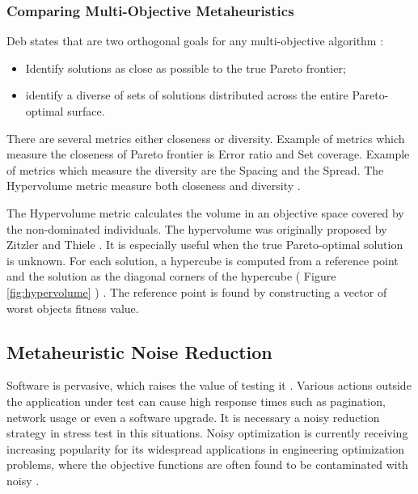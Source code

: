\documentclass[espaco=umemeio,chapter=TITLE,twoside,openright]{abnt}
\begin{document}
\subsubsection{Comparing Multi-Objective Metaheuristics}

Deb states that are two orthogonal goals for any multi-objective algorithm \cite{deb2001multi}:

\begin{itemize}
\item Identify solutions as close as possible  to the true Pareto frontier;
\item identify a diverse of sets of solutions distributed across the entire Pareto-optimal surface.
\end{itemize}

There are several metrics either closeness or diversity. Example of metrics which measure the closeness of Pareto frontier is Error ratio and Set coverage. Example of metrics which measure the diversity are the Spacing and the Spread. The Hypervolume metric measure both closeness and diversity \cite{janssens2010multiple}.

The Hypervolume metric calculates the volume in an objective space covered by the non-dominated individuals. The hypervolume was originally proposed by Zitzler and Thiele \cite{Zitzler1999}. It is especially useful when the true Pareto-optimal solution is unknown. For each solution, a hypercube is computed from a reference point and the solution as the diagonal corners of the hypercube ( Figure \ref{fig:hypervolume} ) \cite{janssens2010multiple}. The reference point is found by constructing a vector of worst objects fitness value.






\subsection{Metaheuristic Noise Reduction}

Software is pervasive, which raises the value of testing it \cite{Sandler2004}. Various actions outside the application under test can cause high response times such as pagination, network usage or even a software upgrade. It is necessary a noisy reduction strategy in stress test in this situations. Noisy optimization is currently receiving increasing popularity for its widespread applications in engineering optimization
problems, where the objective functions are often found to be contaminated with noisy \cite{Rakshit2017}. 
\end{document}
